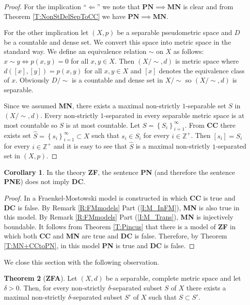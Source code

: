 \documentclass[11pt, reqno]{amsart}
\theoremstyle{definition}
\newtheorem{theorem}{Theorem}
\numberwithin{theorem}{section}
\theoremstyle{definition}
\theoremstyle{definition}
\theoremstyle{definition}
\theoremstyle{definition}
\newcommand{\brac}[1]{\left({#1}\right)}
\theoremstyle{definition}
\numberwithin{claim}{section}
\theoremstyle{definition}
\theoremstyle{definition}
\newtheorem{corollary}[theorem]{Corollary}
\theoremstyle{definition}
\theoremstyle{definition}
\theoremstyle{definition}
\theoremstyle{remboldstyle}
\begin{document}
\begin{proof}
For the implication ``$\Longleftarrow$'' we note that $\mathbf{PN} \implies \mathbf{MN}$ is clear and from Theorem \ref{T:NonStDelSepToCC} we have $\mathbf{PN} \implies \mathbf{MN}$.

For the other implication let $(X, p)$ be a separable pseudometric space and $D$ be a countable and dense set. We convert this space into metric space in the standard way. We define an equivalence relation $\sim$ on $X$ as follows: $x \sim y \Longleftrightarrow p(x,y) = 0$ for all $x, y \in X$. Then $(X/{\sim}, d)$ is metric space where $d\brac{[x], [y]} = p(x,y)$ for all $x, y \in X$ and $[x]$ denotes the equivalence class of $x$. Obviously $D/{\sim}$ is a countable and dense set in $X/{\sim}$ so $(X/{\sim}, d)$ is separable.

Since we assumed \textbf{MN}, there exists a maximal non-strictly $1$-separable set $S$ in $(X/{\sim}, d)$. Every non-strictly $1$-separated in every separable metric space is at most countable so $S$ is at most countable. Let $S = \left\{S_i\right\}_{i=1}^\infty$. From \textbf{CC} there exists set $\widehat{S} = \left\{s_i\right\}_{i=1}^\infty \subset X$ such that $s_i \in S_i$ for every $i \in \mathbb{Z}^+$. Then $[s_i] = S_i$ for every $i \in \mathbb{Z}^+$ and it is easy to see that $\widehat{S}$ is a maximal non-strictly $1$-separated set in $(X, p)$.
\end{proof}

\begin{corollary} \label{C:PNnotToDC}
In the theory \textbf{ZF}, the sentence \textbf{PN} (and therefore the sentence \textbf{PNE}) does not imply \textbf{DC}.
\end{corollary}
\begin{proof}
In \cite{HR1996} a Fraenkel-Mostowski model is constructed in which \textbf{CC} is true and \textbf{DC} is false. By Remark \ref{R:FMmodels} Part (\ref{I:M_InFM}), \textbf{MN} is also true in this model.  By Remark \ref{R:FMmodels} Part (\ref{I:M_Trans}), \textbf{MN} is injectively boundable.  It follows from Theorem \ref{T:Pincus} that there is a model of \textbf{ZF} in which both \textbf{CC} and \textbf{MN} are true and \textbf{DC} is false. 
Therefore, by Theorem \ref{T:MN+CCtoPN}, in this model \textbf{PN} is true and \textbf{DC} is false.
\end{proof}

We close this section with the following observation.
\begin{theorem}[\textbf{ZFA}]\label{nonstrictZF}
 Let $(X, d)$ be a separable, complete metric space and let $\delta > 0$. Then, for every non-strictly $\delta$-separated subset $S$ of $X$ there exists a maximal non-strictly $\delta$-separated subset $S'$ of $X$ such that $S \subset S'$.
\end{theorem}
\end{document}
